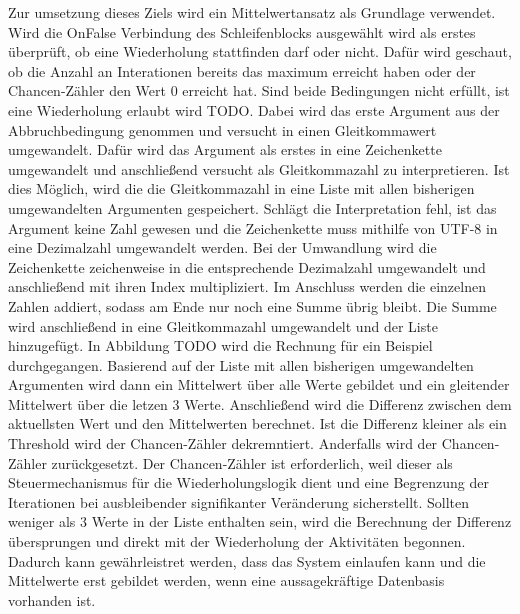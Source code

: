 \documentclass{article}
\begin{document}
    Zur umsetzung dieses Ziels wird ein Mittelwertansatz als Grundlage verwendet.
    Wird die OnFalse Verbindung des Schleifenblocks ausgewählt wird als erstes überprüft, ob eine Wiederholung stattfinden darf oder nicht.
    Dafür wird geschaut, ob die Anzahl an Interationen bereits das maximum erreicht haben oder der Chancen-Zähler den Wert 0 erreicht hat.
    Sind beide Bedingungen nicht erfüllt, ist eine Wiederholung erlaubt wird TODO.
    Dabei wird das erste Argument aus der Abbruchbedingung genommen und versucht in einen Gleitkommawert umgewandelt. %
    Dafür wird das Argument als erstes in eine Zeichenkette umgewandelt und anschließend versucht als Gleitkommazahl zu interpretieren.
    Ist dies Möglich, wird die die Gleitkommazahl in eine Liste mit allen bisherigen umgewandelten Argumenten gespeichert.
    Schlägt die Interpretation fehl, ist das Argument keine Zahl gewesen und die Zeichenkette muss mithilfe von UTF-8 in eine Dezimalzahl umgewandelt werden.
    Bei der Umwandlung wird die Zeichenkette zeichenweise in die entsprechende Dezimalzahl umgewandelt und anschließend mit ihren Index multipliziert.
    Im Anschluss werden die einzelnen Zahlen addiert, sodass am Ende nur noch eine Summe übrig bleibt.
    Die Summe wird anschließend in eine Gleitkommazahl umgewandelt und der Liste hinzugefügt.
    In Abbildung TODO wird die Rechnung für ein Beispiel durchgegangen.
    Basierend auf der Liste mit allen bisherigen umgewandelten Argumenten wird dann ein Mittelwert über alle Werte gebildet und ein gleitender Mittelwert über die letzen 3 Werte.
    Anschließend wird die Differenz zwischen dem aktuellsten Wert und den Mittelwerten berechnet. 
    Ist die Differenz kleiner als ein Threshold wird der Chancen-Zähler dekremntiert. 
    Anderfalls wird der Chancen-Zähler zurückgesetzt.
    Der Chancen-Zähler ist erforderlich, weil dieser als Steuermechanismus für die Wiederholungslogik dient und eine Begrenzung der Iterationen bei ausbleibender signifikanter Veränderung sicherstellt.
    Sollten weniger als 3 Werte in der Liste enthalten sein, wird die Berechnung der Differenz übersprungen und direkt mit der Wiederholung der Aktivitäten begonnen.
    Dadurch kann gewährleistret werden, dass das System einlaufen kann und die Mittelwerte erst gebildet werden, wenn eine aussagekräftige Datenbasis vorhanden ist.   
\end{document}
